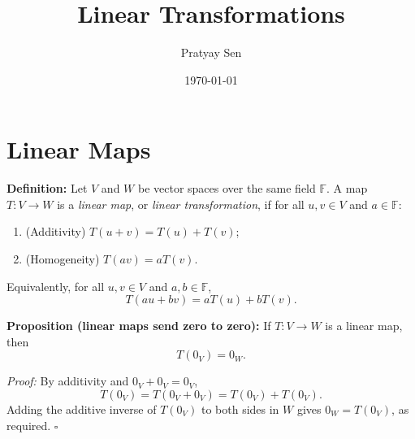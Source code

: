 \documentclass[a4paper,11pt,abstract=true]{scrartcl}
\theoremstyle{dotlessP}
\theoremstyle{dotlessS}
\theoremstyle{remark}
\theoremstyle{definition}
\begin{document}


\title{Linear Transformations}
\author{Pratyay Sen}
\date{\today}

\maketitle

\tableofcontents

\clearpage



\section{Linear Maps}

\begin{definition_box}
\textbf{Definition:} Let $V$ and $W$ be vector spaces over the same
field $\mathbb{F}$. A map $T:V\longrightarrow W$ is a \emph{linear map},
or \emph{linear transformation}, if for all $u,v\in V$ and
$a\in\mathbb{F}$:
\begin{enumerate}
    \item (Additivity) $T(u+v)=T(u)+T(v)$;
    \item (Homogeneity) $T(av)=aT(v)$.
\end{enumerate}
Equivalently, for all $u,v\in V$ and $a,b\in\mathbb{F}$,
\[
T(au+bv)=aT(u)+bT(v).
\]
\end{definition_box}

\begin{claim_box}
\textbf{Proposition (linear maps send zero to zero):} If
$T:V\longrightarrow W$ is a linear map, then
\[
T(0_V)=0_W.
\]

\textit{Proof:} By additivity and $0_V+0_V=0_V$,
\[
T(0_V)=T(0_V+0_V)=T(0_V)+T(0_V).
\]
Adding the additive inverse of $T(0_V)$ to both sides in $W$ gives
$0_W=T(0_V)$, as required. \hfill$\square$
\end{claim_box}
\end{document}
